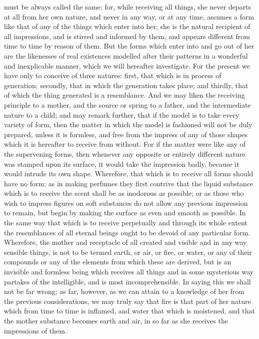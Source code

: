 must be always called the same; for, while receiving all things, she never
departs at all from her own nature, and never in any way, or at any time,
assumes a form like that of any of the things which enter into her; she is
the natural recipient of all impressions, and is stirred and informed by
them, and appears different from time to time by reason of them. But the
forms which enter into and go out of her are the likenesses of real
existences modelled after their patterns in a wonderful and inexplicable
manner, which we will hereafter investigate. For the present we have only
to conceive of three natures: first, that which is in process of
generation; secondly, that in which the generation takes place; and
thirdly, that of which the thing generated is a resemblance. And we may
liken the receiving principle to a mother, and the source or spring to a
father, and the intermediate nature to a child; and may remark further,
that if the model is to take every variety of form, then the matter in
which the model is fashioned will not be duly prepared, unless it is
formless, and free from the impress of any of those shapes which it is
hereafter to receive from without. For if the matter were like any of the
supervening forms, then whenever any opposite or entirely different nature
was stamped upon its surface, it would take the impression badly, because
it would intrude its own shape. Wherefore, that which is to receive all
forms should have no form; as in making perfumes they first contrive that
the liquid substance which is to receive the scent shall be as inodorous
as possible; or as those who wish to impress figures on soft substances do
not allow any previous impression to remain, but begin by making the
surface as even and smooth as possible. In the same way that which is to
receive perpetually and through its whole extent the resemblances of all
eternal beings ought to be devoid of any particular form. Wherefore, the
mother and receptacle of all created and visible and in any way sensible
things, is not to be termed earth, or air, or fire, or water, or any of
their compounds or any of the elements from which these are derived, but
is an invisible and formless being which receives all things and in some
mysterious way partakes of the intelligible, and is most incomprehensible.
In saying this we shall not be far wrong; as far, however, as we can
attain to a knowledge of her from the previous considerations, we may
truly say that fire is that part of her nature which from time to time is
inflamed, and water that which is moistened, and that the mother substance
becomes earth and air, in so far as she receives the impressions of them.

